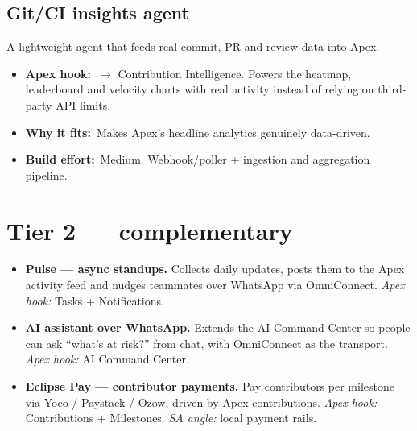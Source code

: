 \documentclass[11pt]{article}
\newcommand{\hook}[1]{\textbf{Apex hook:}~#1}
\newcommand{\fit}[1]{\textbf{Why it fits:}~#1}
\newcommand{\effort}[1]{\textbf{Build effort:}~#1}
\begin{document}
\subsection{Git/CI insights agent}
A lightweight agent that feeds real commit, PR and review data into Apex.
\begin{itemize}
  \item \hook{$\rightarrow$ Contribution Intelligence.} Powers the heatmap, leaderboard and velocity charts with real activity instead of relying on third-party API limits.
  \item \fit{Makes Apex's headline analytics genuinely data-driven.}
  \item \effort{Medium. Webhook/poller + ingestion and aggregation pipeline.}
\end{itemize}

\section{Tier 2 --- complementary}
\begin{itemize}
  \item \textbf{Pulse --- async standups.} Collects daily updates, posts them to the Apex activity feed and nudges teammates over WhatsApp via OmniConnect. \emph{Apex hook:} Tasks + Notifications.
  \item \textbf{AI assistant over WhatsApp.} Extends the AI Command Center so people can ask ``what's at risk?'' from chat, with OmniConnect as the transport. \emph{Apex hook:} AI Command Center.
  \item \textbf{Eclipse Pay --- contributor payments.} Pay contributors per milestone via Yoco / Paystack / Ozow, driven by Apex contributions. \emph{Apex hook:} Contributions + Milestones. \emph{SA angle:} local payment rails.
\end{itemize}
\end{document}
